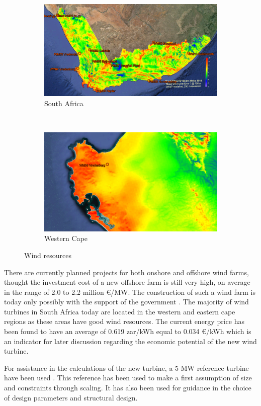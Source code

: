 \begin{figure}[H] 
\centering
\begin{subfigure}{0.45\textwidth}
\includegraphics[width=\linewidth]{Images/Wind_atlas_map.PNG} 
\caption{South Africa}
\label{fig:windsa}
\end{subfigure}~
\begin{subfigure}{0.423\textwidth}
\includegraphics[width=\linewidth]{Images/Wind_atlas_zoomed.PNG}
\caption{Western Cape}
\label{fig:windlocation}
\end{subfigure}
\caption{Wind resources}
\label{fig:windrs}
\end{figure}

There are currently planned projects for both onshore and offshore wind farms, thought the investment cost of a new offshore farm is still very high, on average in the range of 2.0 to 2.2 million €/MW. The construction of such a wind farm is today only possibly with the support of the government \cite{offcost}. The majority of wind turbines in South Africa today are located in the western and eastern cape regions as these areas have good wind resources. The current energy price has been found to have an average of 0.619 zar/kWh equal to 0.034 €/kWh \cite{eprice} which is an indicator for later discussion regarding the economic potential of the new wind turbine.

For assistance in the calculations of the new turbine, a 5 MW reference turbine have been used \cite{5MW}. This reference has been used to make a first assumption of size and constraints through scaling. It has also been used for guidance in the choice of design parameters and structural design.
